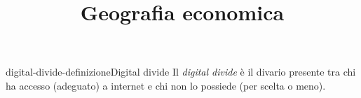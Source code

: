 \documentclass[preview]{standalone}
\begin{document}
\title{Geografia economica}
\genpage

\begin{snippetdefinition}{digital-divide-definizione}{Digital divide}
    Il \textit{digital divide} è il divario presente tra chi ha accesso
    (adeguato) a internet e chi non lo possiede (per
    scelta o meno).
\end{snippetdefinition}

\end{document}
